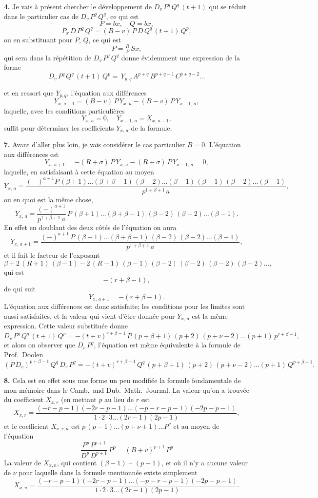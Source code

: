 \documentclass[11pt,a4paper]{book}
\begin{document}
\textbf{4.} Je vais à présent chercher le développement de $D_v\,P^q\,Q^q\,(t+1)$ qui se réduit dans le particulier cas de $D_v\,P^q\,Q^q$, ce qui est
\[
P = bx,\quad Q = bx,
\]
\[
P_x\,D\,P^q\,Q^q = (B-v)\,P\,D\,Q^q\,(t+1)\,Q^p,
\]
ou en substituant pour $P$, $Q$, ce qui est
\[
P = \tfrac{R}{P}\,Sx,
\]
qui sera dans la répétition de $D_v\,P^q\,Q^q$ donne évidemment une expression de la forme
\[
D_v\,P^q\,Q^q\,(t+1)\,Q^p = \,Y_{p,q}\,A^{p+q}\,B^{p+q-1}\,C^{p+q-2}\ldots
\]

\setcounter{page}{140}

et en ressort que $Y_{p,q}$, l'équation aux différences
\[
Y_{x,\,a+1} = (B-v)\,P\,Y_{x,\,a} - (B-v)\,P\,Y_{x-1,\,a},
\]
laquelle, avec les conditions particulières
\[
Y_{x,\,a} = 0,\quad Y_{x-1,\,a} = X_{x,\,a-1},
\]
suffit pour déterminer les coefficients $Y_{x,\,a}$ de la formule.

\textbf{7.} Avant d'aller plus loin, je vais considérer le cas particulier $B=0$. L'équation aux différences est
\[
Y_{x,\,a+1} = -(R+\sigma)\,P\,Y_{x,\,a} - (R+\sigma)\,P\,Y_{x-1,\,a} = 0,
\]
laquelle, en satisfaisant à cette équation au moyen
\[
Y_{x,\,a} = \frac{(-)^{a+1}P\,(\beta+1)\ldots(\beta+\beta-1)\,(\beta-2)\ldots(\beta-1)\,(\beta-1)\,(\beta-2)\ldots(\beta-1)}{p^{1+\beta+1}\,a},
\]
ou en quoi est la même chose,
\[
Y_{x,\,a} = \frac{(-)^{a+1}}{p^{1+\beta+1}\,a}\,P\,(\beta+1)\ldots(\beta+\beta-1)\,(\beta-2)\,(\beta-2)\ldots(\beta-1).
\]
En effet en doublant des deux côtés de l'équation on aura
\[
Y_{x,\,a+1} = \frac{(-)^{a+1}\,P\,(\beta+1)\ldots(\beta+\beta-1)\,(\beta-2)\,(\beta-2)\ldots(\beta-1)}{p^{1+\beta+1}\,a},
\]
et il fait le facteur de l'exposant
\[
\beta + 2\,(R+1)\,(\beta-1) - 2\,(R-1)\,(\beta-1)\,(\beta-2)\,(\beta-2)\,(\beta-2)\,(\beta-2)\ldots,
\]
qui est
\[
- (r+\beta-1),
\]
de qui suit
\[
Y_{x,\,a+1} = -(r+\beta-1).
\]
L'équation aux différences est donc satisfaite; les conditions pour les limites sont aussi satisfaites, et la valeur qui vient d'être donnée pour $Y_{x,\,a}$ est la même expression. Cette valeur substituée donne
\[
D_v\,P^q\,Q^q\,(t+1)\,Q^p = -(t+v)^{r+\beta-1}\,P\,(p+\beta+1)\,(p+2)\,(p+\nu-2)\ldots(p+1)\,p^{r+\beta-1},
\]
et alors on observer que $D_v\,P^q$, l'équation est même équivalente à la formule de Prof.~Doolen
\[
(P\,D_v)^{p+\beta-1}\,Q^q\,D_v\,P^q = -(t+v)^{r+\beta-1}\,Q^q\,(p+\beta+1)\,(p+2)\,(p+\nu-2)\ldots(p+1)\,Q^{p+\beta-1}.
\]

\setcounter{page}{141}

\textbf{8.} Cela est en effet sous une forme un peu modifiée la formule fondamentale de mon mémoire dans le Camb.\ and Dub.\ Math.\ Journal. La valeur qu'on a trouvée du coefficient $X_{x,r}$ (en mettant $p$ au lieu de $r$ est
\[
X_{x,r} = \frac{(-r-p-1)(-2r-p-1)\ldots(-p-r-p-1)(-2p-p-1)}{1\cdot 2\cdot 3 \ldots (2r-1)(2p-1)},
\]
et le coefficient $X_{x,r,n}$ est $p\,(p-1)\ldots(p+\nu+1)\ldots P^\nu$ et au moyen de l'équation
\[
\frac{P^p\,P^{p+1}}{D^p\,D^{p+1}}\,P^p = (B+v)^{p+1}\,P^p
\]
La valeur de $X_{x,n}$, qui contient $(\beta-1)$ -- $(p+1)$, et où il n'y a aucune valeur de $\nu$ pour laquelle dans la formule mentionnée existe simplement
\[
X_{x,n} = \frac{(-r-p-1)(-2r-p-1)\ldots(-p-r-p-1)(-2p-p-1)}{1\cdot 2\cdot 3 \ldots (2r-1)(2p-1)}.
\]
\end{document}
